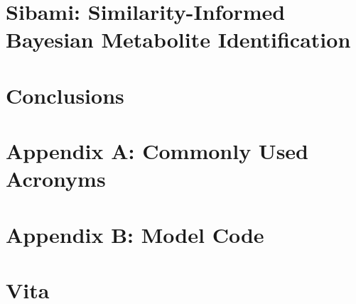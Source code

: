 \documentclass[final]{ulthesis}
\begin{document}
\chapter{Sibami: Similarity-Informed Bayesian Metabolite Identification}

\chapter{Conclusions} 



\backmatter





%
%





\chapter{Appendix A: Commonly Used Acronyms}



\chapter{Appendix B: Model Code}



\chapter{Vita}

\end{document}
